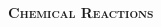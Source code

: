 \documentclass[main.tex]{subfiles}
\begin{document}
\begin{multicols*}{2}
\begin{enumerate}
%
%
{\raggedright\textsc{\textbf{Chemical Reactions}}\par}


\end{enumerate}
\end{multicols*}
\end{document}

